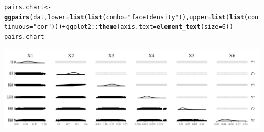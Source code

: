\documentclass[11pt,a4paper,twoside]{book}
\makeatletter
\def\maxwidth{ %
  \ifdim\Gin@nat@width>\linewidth
    \linewidth
  \else
    \Gin@nat@width
  \fi
}
\newcommand{\hlnum}[1]{\textcolor[rgb]{0.686,0.059,0.569}{#1}}%
\newcommand{\hlstr}[1]{\textcolor[rgb]{0.192,0.494,0.8}{#1}}%
\newcommand{\hlopt}[1]{\textcolor[rgb]{0,0,0}{#1}}%
\newcommand{\hlstd}[1]{\textcolor[rgb]{0.345,0.345,0.345}{#1}}%
\newcommand{\hlkwb}[1]{\textcolor[rgb]{0.69,0.353,0.396}{#1}}%
\newcommand{\hlkwc}[1]{\textcolor[rgb]{0.333,0.667,0.333}{#1}}%
\newcommand{\hlkwd}[1]{\textcolor[rgb]{0.737,0.353,0.396}{\textbf{#1}}}%
\newenvironment{kframe}{%
 \def\at@end@of@kframe{}%
 \ifinner\ifhmode%
  \def\at@end@of@kframe{\end{minipage}}%
  \begin{minipage}{\columnwidth}%
 \fi\fi%
 \def\FrameCommand##1{\hskip\@totalleftmargin \hskip-\fboxsep
 \colorbox{shadecolor}{##1}\hskip-\fboxsep
     \hskip-\linewidth \hskip-\@totalleftmargin \hskip\columnwidth}%
 \MakeFramed {\advance\hsize-\width
   \@totalleftmargin\z@ \linewidth\hsize
   \@setminipage}}%
 {\par\unskip\endMakeFramed%
 \at@end@of@kframe}
\newenvironment{knitrout}{}{} %
\makeatother
\begin{document}
\begin{knitrout}
\begin{kframe}
\begin{alltt}
\hlstd{pairs.chart} \hlkwb{<-} \hlkwd{ggpairs}\hlstd{(dat,} \hlkwc{lower} \hlstd{=} \hlkwd{list}\hlstd{(}\hlkwd{list}\hlstd{(}\hlkwc{combo} \hlstd{=} \hlstr{"facetdensity"}\hlstd{)),} \hlkwc{upper} \hlstd{=} \hlkwd{list}\hlstd{(}\hlkwd{list}\hlstd{(}\hlkwc{continuous} \hlstd{=} \hlstr{"cor"}\hlstd{)))} \hlopt{+} \hlstd{ggplot2}\hlopt{::}\hlkwd{theme}\hlstd{(}\hlkwc{axis.text} \hlstd{=} \hlkwd{element_text}\hlstd{(}\hlkwc{size} \hlstd{=} \hlnum{6}\hlstd{))}
\hlstd{pairs.chart}
\end{alltt}
\end{kframe}
\includegraphics[width=\maxwidth]{figure/ch03_figreal_data_LMG-2} 

\end{knitrout}








 

\end{document}
